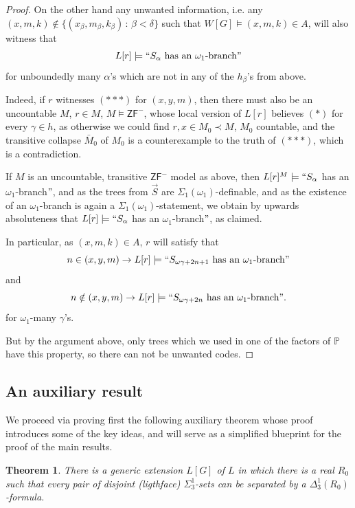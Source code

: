 \documentclass[a4paper,11pt]{article}
\newtheorem{theorem}{Theorem}[section]
\newcommand{\forceP}{\mathbb{P}}
\newcommand{\ZFP}{\mathsf{ZF}^-}
\begin{document}
\begin{proof}
On the other hand any unwanted information, i.e. any $(x,m,k) \notin \{(x_{\beta}, m_{\beta},k_{\beta}) \, : \, \beta < \delta \}$ such that $W[G] \models (x,m,k) \in A$, will also witness that \[L[r] \models `` S_{\alpha} \text{ has an $\omega_1$-branch}"\] for unboundedly many $\alpha$'s which are not in any of the $h_{\beta}$'s from above.

Indeed, if $r$ witnesses $({\ast} {\ast} {\ast})$ for $(x,y,m)$, then there must also be an uncountable $M$, $r \in M$, $M \models \ZFP$, whose local version of $L[r]$ believes $(\ast)$ for every $\gamma \in h$, as otherwise we could find $r, x \in M_0 \prec M$, $M_0$ countable, and the transitive collapse $\bar{M}_0$ of $M_0$ is a counterexample to the truth of $({\ast} {\ast} {\ast})$, which is a contradiction.

If $M$ is an uncountable, transitive $\ZFP$ model as above, then
$L[r]^M \models ``S_{\alpha}$  has an $\omega_1$-branch$"$, and as the trees from $\vec{S}$ are $\Sigma_1(\omega_1)$-definable, and as the existence of an $\omega_1$-branch is again a $\Sigma_1(\omega_1)$-statement, we obtain by upwards absoluteness that $L[r] \models ``S_{\alpha}$  has an $\omega_1$-branch$"$, as claimed.


In particular, as $(x,m,k ) \in A$, $r$ will satisfy that
\[n \in (x,y,m) \rightarrow L[r] \models ``S_{\omega \gamma+2n+1} \text{ has an $\omega_1$-branch}" \]
and
\[ n \notin (x,y,m) \rightarrow L[r] \models ``S_{\omega \gamma+2n} \text{ has an $\omega_1$-branch}". \] for $\omega_1$-many $\gamma$'s.

But by the argument above, only trees which we used in one of the factors of $\forceP$ have this property, so there can not be unwanted codes.


\end{proof}



\subsection{An auxiliary result}
We proceed via proving first the following auxiliary theorem whose proof introduces some of the key ideas, and will serve as a simplified blueprint for the proof of the main results.
\begin{theorem}
There is a generic extension $L[G]$ of $L$ in which there is a real $R_0$ such that every pair of disjoint (ligthface) $\Sigma^1_3$-sets can be separated by a $\Delta^1_3(R_0)$-formula.
\end{theorem}
\end{document}
